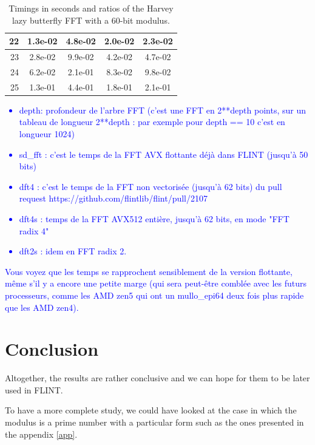 \documentclass[a4paper]{article}
\begin{document}
\begin{table}[h!]
\begin{tabular}{|r|*{4}{c|}}
        \hline
        \cellcolor{myGray} 22 & 1.3e-02 & 4.8e-02 & 2.0e-02 & 2.3e-02 \\
        \hline
        \cellcolor{myGray} 23 & 2.8e-02 & 9.9e-02 & 4.2e-02 & 4.7e-02 \\
        \hline
        \cellcolor{myGray} 24 & 6.2e-02 & 2.1e-01 & 8.3e-02 & 9.8e-02 \\
        \hline
        \cellcolor{myGray} 25 & 1.3e-01 & 4.4e-01 & 1.8e-01 & 2.1e-01 \\
        \hline
    \end{tabular}
    \caption{Timings in seconds and ratios of the Harvey lazy butterfly FFT with a 60-bit modulus.}
\end{table}

\textcolor{blue}{
\begin{itemize}
    \item depth: profondeur de l'arbre FFT (c'est une FFT en 2**depth points, sur un
    tableau de longueur 2**depth : par exemple pour depth == 10 c'est en longueur
    1024)
    \item sd\_fft : c'est le temps de la FFT AVX flottante déjà dans FLINT (jusqu'à 50
    bits)
    \item dft4 : c'est le temps de la FFT non vectorisée (jusqu'à 62 bits) du pull request
    https://github.com/flintlib/flint/pull/2107
    \item dft4s : temps de la FFT AVX512 entière, jusqu'à 62 bits, en mode "FFT radix 4"
    \item dft2s : idem en FFT radix 2.
\end{itemize}
}

\textcolor{blue}{
    Vous voyez que les temps se rapprochent sensiblement de la version flottante,
même s'il y a encore une petite marge (qui sera peut-être comblée avec les
futurs processeurs, comme les AMD zen5 qui ont un mullo\_epi64 deux fois plus
rapide que les AMD zen4).
}









\section{Conclusion}

Altogether, the results are rather conclusive and we can hope for them to be later used in FLINT. 

\bigskip
To have a more complete study, we could have looked at the case in which the modulus is a prime number
with a particular form such as the ones presented in the appendix \ref{app}. 
\end{document}
